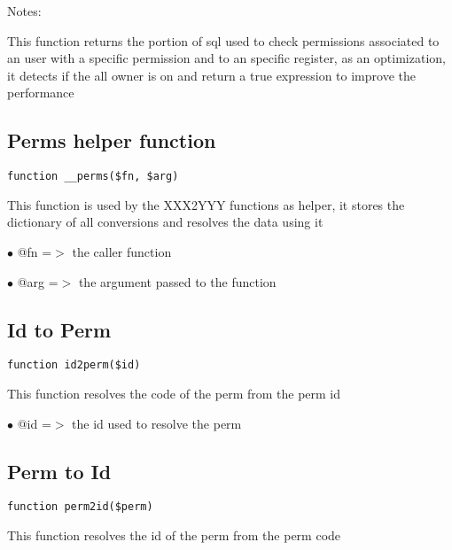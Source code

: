 \documentclass[a4paper]{book}
\begin{document}
Notes:

This function returns the portion of sql used to check permissions
associated to an user with a specific permission and to an specific
register, as an optimization, it detects if the all owner is on and
return a true expression to improve the performance

\hypertarget{toc206}{}
\subsection{Perms helper function}

\begin{lstlisting}
function __perms($fn, $arg)
\end{lstlisting}

This function is used by the XXX2YYY functions as helper, it stores the
dictionary of all conversions and resolves the data using it

\begin{compactitem}
\item[\color{myblue}$\bullet$] @fn  =$>$ the caller function
\item[\color{myblue}$\bullet$] @arg =$>$ the argument passed to the function
\end{compactitem}

\hypertarget{toc207}{}
\subsection{Id to Perm}

\begin{lstlisting}
function id2perm($id)
\end{lstlisting}

This function resolves the code of the perm from the perm id

\begin{compactitem}
\item[\color{myblue}$\bullet$] @id =$>$ the id used to resolve the perm
\end{compactitem}

\hypertarget{toc208}{}
\subsection{Perm to Id}

\begin{lstlisting}
function perm2id($perm)
\end{lstlisting}

This function resolves the id of the perm from the perm code
\end{document}
